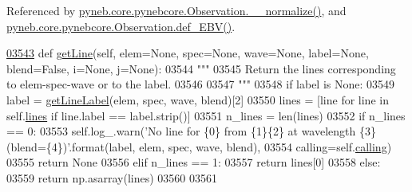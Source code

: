 Referenced by \hyperlink{pynebcore_8py_source_l03885}{pyneb.\+core.\+pynebcore.\+Observation.\+\_\+\+\_\+normalize()}, and \hyperlink{pynebcore_8py_source_l03861}{pyneb.\+core.\+pynebcore.\+Observation.\+def\+\_\+\+E\+B\+V()}.


\begin{DoxyCode}
\hypertarget{classpyneb_1_1core_1_1pynebcore_1_1_observation_l03543}{}\hyperlink{classpyneb_1_1core_1_1pynebcore_1_1_observation_a9994c84a500a6a31a5376ed6c7782ce3}{03543}     \textcolor{keyword}{def }\hyperlink{classpyneb_1_1core_1_1pynebcore_1_1_observation_a9994c84a500a6a31a5376ed6c7782ce3}{getLine}(self, elem=None, spec=None, wave=None, label=None, blend=False, i=None, j=None):
03544         \textcolor{stringliteral}{"""}
03545 \textcolor{stringliteral}{        Return the lines corresponding to elem-spec-wave or to the label.}
03546 \textcolor{stringliteral}{        }
03547 \textcolor{stringliteral}{        """}
03548         \textcolor{keywordflow}{if} label \textcolor{keywordflow}{is} \textcolor{keywordtype}{None}:
03549             label = \hyperlink{namespacepyneb_1_1core_1_1pynebcore_a14c882fc308d727f77ed33c1f56212e4}{getLineLabel}(elem, spec, wave, blend)[2]
03550         lines = [line \textcolor{keywordflow}{for} line \textcolor{keywordflow}{in} self.\hyperlink{classpyneb_1_1core_1_1pynebcore_1_1_observation_a78332043ca9f290590edf6b8a1e5b767}{lines} \textcolor{keywordflow}{if} line.label == label.strip()]
03551         n\_lines = len(lines)
03552         \textcolor{keywordflow}{if} n\_lines == 0:
03553             self.log\_.warn(\textcolor{stringliteral}{'No line for \{0\} from \{1\}\{2\} at wavelength \{3\} (blend=\{4\})'}.format(label, elem, 
      spec, wave, blend),
03554                            calling=self.\hyperlink{classpyneb_1_1core_1_1pynebcore_1_1_observation_a2639fad9af4fefad20e4097295bd40e7}{calling})
03555             \textcolor{keywordflow}{return} \textcolor{keywordtype}{None}
03556         \textcolor{keywordflow}{elif} n\_lines == 1:
03557             \textcolor{keywordflow}{return} lines[0]
03558         \textcolor{keywordflow}{else}:
03559             \textcolor{keywordflow}{return} np.asarray(lines)
03560  
03561 
\end{DoxyCode}
\hypertarget{classpyneb_1_1core_1_1pynebcore_1_1_observation_a2b18c06854c5492b53b7e91311bf1cff}{}
